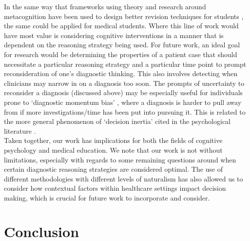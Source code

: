 \documentclass[a4paper, nobind]{templates/ociamthesis}
\begin{document}
In the same way that frameworks using theory and research around metacognition have been used to design better revision techniques for students \autocite{dunlosky_strengthening_2013,putnam_optimizing_2016}, the same could be applied for medical students. Where this line of work would have most value is considering cognitive interventions in a manner that is dependent on the reasoning strategy being used. For future work, an ideal goal for research would be determining the properties of a patient case that should necessitate a particular reasoning strategy and a particular time point to prompt reconsideration of one's diagnostic thinking. This also involves detecting when clinicians may narrow in on a diagnosis too soon. The prompts of uncertainty to reconsider a diagnosis (discussed above) may be especially useful for individuals prone to `diagnostic momentum bias' \autocite{ryan_diagnostic_2021,aron_diagnostic_2024}, where a diagnosis is harder to pull away from if more investigations/time has been put into pursuing it. This is related to the more general phenomenon of `decision inertia' cited in the psychological literature \autocite{akaishi_autonomous_2014}.\\

Taken together, our work has implications for both the fields of cognitive psychology and medical education. We note that our work is not without limitations, especially with regards to some remaining questions around when certain diagnostic reasoning strategies are considered optimal. The use of different methodologies with different levels of naturalism has also allowed us to consider how contextual factors within healthcare settings impact decision making, which is crucial for future work to incorporate and consider.

\section{Conclusion}\label{conclusion}
\end{document}
